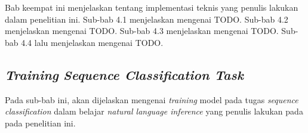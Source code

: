 \chapter{\babEmpat}
\label{bab:4}
Bab keempat ini menjelaskan tentang implementasi teknis yang penulis lakukan dalam penelitian ini. Sub-bab 4.1 menjelaskan mengenai TODO. Sub-bab 4.2 menjelaskan mengenai  TODO. Sub-bab 4.3 menjelaskan mengenai TODO. Sub-bab 4.4 lalu menjelaskan mengenai TODO.

\section{\emph{Training} \emph{Sequence Classification Task}}
Pada sub-bab ini, akan dijelaskan mengenai \emph{training} model pada tugas \emph{sequence classification} dalam belajar \emph{natural language inference} yang penulis lakukan pada pada penelitian ini. 

